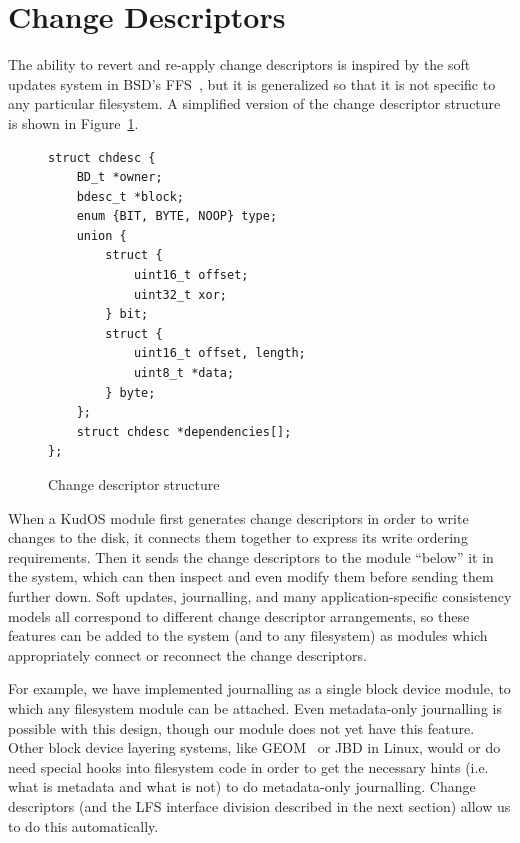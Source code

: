 \preparagraphspacing{}
\section*{Change Descriptors}
\label{sec:chdescs}


The ability to revert and re-apply change descriptors is inspired by the soft
updates system in BSD's FFS~\cite{ganger00soft}, but it is generalized so that
it is not specific to any particular filesystem. A simplified version of the
change descriptor structure is shown in Figure~\ref{fig:chdesc}.

\begin{figure}
\begin{verbatim}
struct chdesc {
    BD_t *owner;
    bdesc_t *block;
    enum {BIT, BYTE, NOOP} type;
    union {
        struct {
            uint16_t offset;
            uint32_t xor;
        } bit;
        struct {
            uint16_t offset, length;
            uint8_t *data;
        } byte;
    };
    struct chdesc *dependencies[];
};
\end{verbatim}
\vspace{-12pt}
\caption{\label{fig:chdesc} Change descriptor structure}
\end{figure}

When a KudOS module first generates change descriptors in order to write changes
to the disk, it connects them together to express its write ordering
requirements. Then it sends the change descriptors to the module ``below'' it in
the system, which can then inspect and even modify them before sending them
further down. Soft updates, journalling, and many application-specific
consistency models all correspond to different change descriptor arrangements,
so these features can be added to the system (and to any filesystem) as modules
which appropriately connect or reconnect the change descriptors.

For example, we have implemented journalling as a single block device module, to
which any filesystem module can be attached. Even metadata-only journalling is
possible with this design, though our module does not yet have this feature.
Other block device layering systems, like GEOM~\cite{geom} or JBD in Linux,
would or do need special hooks into filesystem code in order to get the
necessary hints (i.e. what is metadata and what is not) to do metadata-only
journalling. Change descriptors (and the LFS interface division described in the
next section) allow us to do this automatically.

